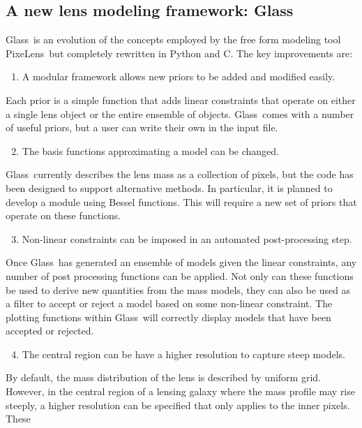 \documentclass[galley]{mn2e}
\newcommand{\Glass}{{\sc Glass}}
\newcommand{\PixeLens}{{\sc PixeLens}}
\begin{document}
\subsection{A new lens modeling framework: \Glass}

\Glass\ is an evolution of the concepts employed by the free form modeling tool
\PixeLens\ but completely rewritten in Python and C. The key improvements are:
%
\begin{enumerate}
  \setcounter{enumi}{0}
  \item A modular framework allows new priors to be added and modified easily.
\end{enumerate}
%
Each prior is a simple function that adds linear constraints that operate on either
a single lens object or the entire ensemble of objects. \Glass\ comes with a number
of useful priors, but a user can write their own in the input file.
%
\begin{enumerate}
  \setcounter{enumi}{1}
  \item The basis functions approximating a model can be changed. 
\end{enumerate}
%
\Glass\ currently describes the lens mass as a collection of pixels, but the code
has been designed to support alternative methods. In particular, it is planned
to develop a module using Bessel functions. This will require a new set of 
priors that operate on these functions.
%
\begin{enumerate}
  \setcounter{enumi}{2}
  \item Non-linear constraints can be imposed in an automated post-processing step. 
\end{enumerate}
%
Once \Glass\ has generated an ensemble of models given the linear constraints, any number
of post processing functions can be applied. Not only can these functions be used to
derive new quantities from the mass models, they can also be used as a filter to 
accept or reject a model based on some non-linear constraint. The plotting functions
within \Glass\ will correctly display models that have been accepted or rejected.
%
\begin{enumerate}
  \setcounter{enumi}{3}
  \item The central region can be have a higher resolution to capture steep models. 
\end{enumerate}
%
By default, the mass distribution of the lens is described by uniform grid. However,
in the central region of a lensing galaxy where the mass profile may rise steeply,
a higher resolution can be specified that only applies to the inner pixels. These
\end{document}

